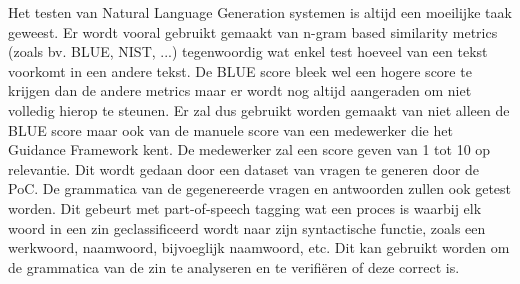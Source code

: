 Het testen van Natural Language Generation systemen is altijd een moeilijke taak geweest. Er wordt vooral gebruikt gemaakt van n-gram based similarity metrics (zoals bv. BLUE, NIST, ...) tegenwoordig wat enkel test hoeveel van een tekst voorkomt in een andere tekst. De BLUE score bleek wel een hogere score te krijgen dan de andere metrics maar er wordt nog altijd aangeraden om niet volledig hierop te steunen.\autocite{Nema2018} Er zal dus gebruikt worden gemaakt van niet alleen de BLUE score maar ook van de manuele score van een medewerker die het Guidance Framework kent. De medewerker zal een score geven van 1 tot 10 op relevantie. Dit wordt gedaan door een dataset van vragen te generen door de PoC. De grammatica van de gegenereerde vragen en antwoorden zullen ook getest worden. Dit gebeurt met part-of-speech tagging wat een proces is waarbij elk woord in een zin geclassificeerd wordt naar zijn syntactische functie, zoals een werkwoord, naamwoord, bijvoeglijk naamwoord, etc. Dit kan gebruikt worden om de grammatica van de zin te analyseren en te verifiëren of deze correct is.






